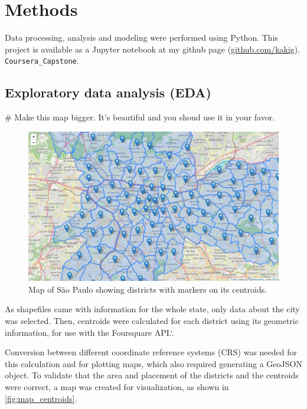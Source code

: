 \documentclass[12pt]{article}
\begin{document}
\section{Methods}

Data processing, analysis and modeling were performed using Python. This project is available as a Jupyter notebook at my github page
(\href{https://github.com/kakig}{github.com/kakig}).
\verb!Coursera_Capstone!.

\vfill

\subsection{Exploratory data analysis (EDA)}


# Make this map bigger. It's beautiful and you shoud use it in your favor.

\begin{figure}
        \centering
        \includegraphics[width=\linewidth]{map_centroids.png}
        \caption{Map of São Paulo showing districts with markers on its
        centroids.\label{fig:map_centroids}}
\end{figure}

As shapefiles came with information for the whole state, only data about the
city was selected. Then, centroids were calculated for each district using its
geometric information, for use with the Foursquare API.\spacefactor\sfcode`.{}


Conversion between different coordinate reference systems (CRS) was needed
for this calculation and for plotting maps, which also required generating a
GeoJSON object. To validate that the area and placement of the districts and the
centroids were correct, a map was created for visualization, as
shown in \autoref{fig:map_centroids}.
\end{document}
